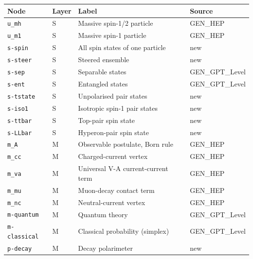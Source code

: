\begin{ruledtabular}
\begin{tabular}{llll}
Node & Layer & Label & Source \\
\hline
\texttt{u\_mh} & S & Massive spin-1/2 particle & GEN\_HEP \\
\texttt{u\_m1} & S & Massive spin-1 particle & GEN\_HEP \\
\texttt{s-spin} & S & All spin states of one particle & new \\
\texttt{s-steer} & S & Steered ensemble & new \\
\texttt{s-sep} & S & Separable states & GEN\_GPT\_Level \\
\texttt{s-ent} & S & Entangled states & GEN\_GPT\_Level \\
\texttt{s-tstate} & S & Unpolarised pair states & new \\
\texttt{s-iso1} & S & Isotropic spin-1 pair states & new \\
\texttt{s-ttbar} & S & Top-pair spin state & new \\
\texttt{s-LLbar} & S & Hyperon-pair spin state & new \\
\texttt{m\_A} & M & Observable postulate, Born rule & GEN\_HEP \\
\texttt{m\_cc} & M & Charged-current vertex & GEN\_HEP \\
\texttt{m\_va} & M & Universal V-A current-current term & GEN\_HEP \\
\texttt{m\_mu} & M & Muon-decay contact term & GEN\_HEP \\
\texttt{m\_nc} & M & Neutral-current vertex & GEN\_HEP \\
\texttt{m-quantum} & M & Quantum theory & GEN\_GPT\_Level \\
\texttt{m-classical} & M & Classical probability (simplex) & GEN\_GPT\_Level \\
\texttt{p-decay} & M & Decay polarimeter & new \\
\end{tabular}
\end{ruledtabular}
